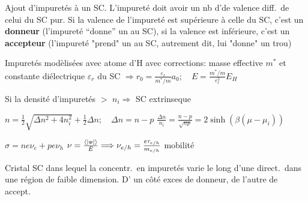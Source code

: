 Ajout d’impuretés à un SC.
L’impureté doit avoir un nb d'\elec de valence diff.\ de celui du SC pur. Si la valence de l’impureté est supérieure à celle du SC, c'est un \textbf{donneur} (l’impureté “donne” un \elec au SC), si la valence est inférieure, c'est un \textbf{accepteur} (l’impureté "prend" un \elec au SC, autrement dit, lui "donne" un trou)
\begin{squishlist}
    \item Impuretés modèlisées avec atome d'H avec corrections: masse effective $m^*$ et constante diélectrique $\varepsilon_r$ du SC 
    $\Longrightarrow r_0 = \frac{\varepsilon_r}{m^*/m} a_0; \quad E=\frac{m^*/m}{\varepsilon_r^2}E_H$
    \item Si la densité d'impuretés $>$ $n_i \Longrightarrow$ SC extrinseque
    \item $n = \frac{1}{2}\sqrt{\Delta n^2 + 4 n_i^2} + \frac{1}{2}\Delta n;\quad \Delta n = n - p$
    \squishsep $\frac{\Delta n }{n_i} = \frac{n-p}{\sqrt{np}} = 2 \sinh (\beta(\mu - \mu_i))$
    \item $\sigma = n e \nu_e + p e \nu_h$ \qquad $\nu = \frac{\braket{|\bm{v}|}}{E} \Longrightarrow \nu_{e/h} = \frac{e \tau_{e/h}}{m_{e/h}}$ mobilité
\end{squishlist}    

Cristal SC dans lequel la concentr.\ en impuretés varie le long d’une direct.\ dans une région de faible dimension. D' un côté exces de donneur, de l'autre de accept.\

